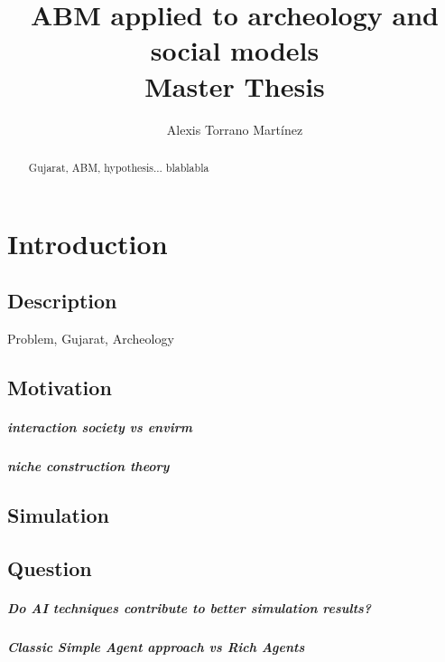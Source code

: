 \documentclass{report}
\begin{document}
\title{ABM applied to archeology and social models\\
\small{Master Thesis}}
\author{Alexis Torrano Mart\'inez}
\maketitle
\newpage

\begin{abstract}
Gujarat, ABM, hypothesis... blablabla
\end{abstract}
\newpage 

\setcounter{tocdepth}{6}
\tableofcontents
\newpage 

\chapter{Introduction}

	\section{Description}
		Problem, Gujarat, Archeology
		
	\section{Motivation}
			\paragraph{interaction society vs envirm}
			\paragraph{niche construction theory}
			
	\section{Simulation}
	
	\section{Question}
			\paragraph{Do AI techniques contribute to better simulation results?}
			\paragraph{Classic Simple Agent approach vs Rich Agents}
\end{document}
